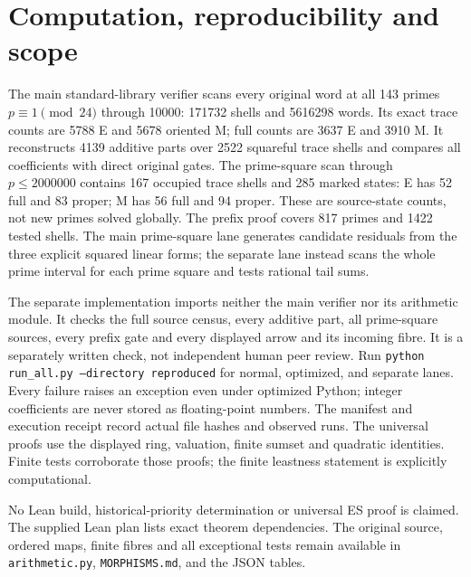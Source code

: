 \section{Computation, reproducibility and scope}
The main standard-library verifier scans every original word at all 143
primes $p\equiv1\pmod{24}$ through 10000: 171732 shells and 5616298 words.
Its exact trace counts are 5788 E and 5678 oriented M; full counts are 3637 E
and 3910 M. It reconstructs 4139 additive parts over 2522 squareful trace
shells and compares all coefficients with direct original gates.
The prime-square scan through $p\le2000000$ contains 167 occupied trace
shells and 285 marked states: E has 52 full and 83 proper; M has 56 full and
94 proper. These are source-state counts, not new primes solved globally.
The prefix proof covers 817 primes and 1422 tested shells. The main prime-square
lane generates candidate residuals from the three explicit squared linear
forms; the separate lane instead scans the whole prime interval for each
prime square and tests rational tail sums.

The separate implementation imports neither the main verifier nor its arithmetic
module. It checks the full source census, every additive part, all prime-square
sources, every prefix gate and every displayed arrow and its incoming fibre.
It is a separately written check, not independent human peer review.
Run \texttt{python run\_all.py --directory reproduced} for normal, optimized,
and separate lanes. Every failure raises an exception even under optimized
Python; integer coefficients are never stored as floating-point numbers.
The manifest and execution receipt record actual file hashes and observed runs.
The universal proofs use the displayed ring, valuation, finite sumset and
quadratic identities. Finite tests corroborate those proofs; the finite
leastness statement is explicitly computational.

No Lean build, historical-priority determination or universal ES proof is
claimed. The supplied Lean plan lists exact theorem dependencies. The original
source, ordered maps, finite fibres and all exceptional tests remain available
in \texttt{arithmetic.py}, \texttt{MORPHISMS.md}, and the JSON tables.
